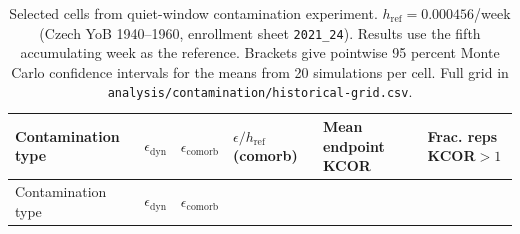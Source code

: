 \documentclass[
]{article}
\begin{document}
\begin{longtable}[]{@{}
  >{\raggedright\arraybackslash}p{}
  >{\raggedright\arraybackslash}p{}
  >{\raggedright\arraybackslash}p{}
  >{\raggedright\arraybackslash}p{}
  >{\raggedright\arraybackslash}p{}
  >{\raggedright\arraybackslash}p{}@{}}
\caption{Selected cells from quiet-window contamination experiment. \(h_{\mathrm{ref}}=0.000456\)/week (Czech YoB 1940--1960, enrollment sheet \protect\texttt{2021\_24}). Results use the fifth accumulating week as the reference. Brackets give pointwise 95 percent Monte Carlo confidence intervals for the means from 20 simulations per cell. Full grid in \protect\texttt{analysis/contamination/historical-grid.csv}.}\label{tbl:quiet_contam}\tabularnewline
\toprule\noalign{}
\begin{minipage}[b]{\linewidth}\raggedright
Contamination type
\end{minipage} & \begin{minipage}[b]{\linewidth}\raggedright
\(\epsilon_{\mathrm{dyn}}\)
\end{minipage} & \begin{minipage}[b]{\linewidth}\raggedright
\(\epsilon_{\mathrm{comorb}}\)
\end{minipage} & \begin{minipage}[b]{\linewidth}\raggedright
\(\epsilon/h_{\mathrm{ref}}\) (comorb)
\end{minipage} & \begin{minipage}[b]{\linewidth}\raggedright
Mean endpoint KCOR
\end{minipage} & \begin{minipage}[b]{\linewidth}\raggedright
Frac. reps KCOR\(>1\)
\end{minipage} \\
\midrule\noalign{}
\endfirsthead
\toprule\noalign{}
\begin{minipage}[b]{\linewidth}\raggedright
Contamination type
\end{minipage} & \begin{minipage}[b]{\linewidth}\raggedright
\(\epsilon_{\mathrm{dyn}}\)
\end{minipage} & \begin{minipage}[b]{\linewidth}\raggedright
\(\epsilon_{\mathrm{comorb}}\)
\end{minipage} & \begin{minipage}[b]{\linewidth}\raggedright

\end{minipage}
\end{longtable}
\end{document}
